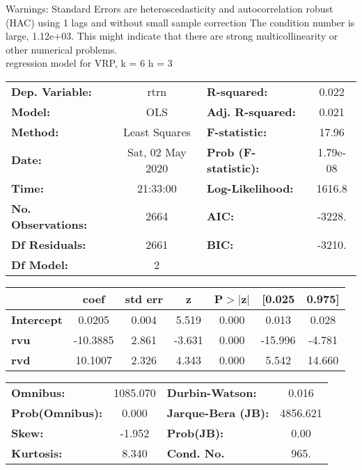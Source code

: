 Warnings: \newline
 [1] Standard Errors are heteroscedasticity and autocorrelation robust (HAC) using 1 lags and without small sample correction \newline
 [2] The condition number is large, 1.12e+03. This might indicate that there are \newline
 strong multicollinearity or other numerical problems.\\ 

regression model for VRP, k = 6 h = 3\begin{center}
\begin{tabular}{lclc}
\toprule
\textbf{Dep. Variable:}    &       rtrn       & \textbf{  R-squared:         } &     0.022   \\
\textbf{Model:}            &       OLS        & \textbf{  Adj. R-squared:    } &     0.021   \\
\textbf{Method:}           &  Least Squares   & \textbf{  F-statistic:       } &     17.96   \\
\textbf{Date:}             & Sat, 02 May 2020 & \textbf{  Prob (F-statistic):} &  1.79e-08   \\
\textbf{Time:}             &     21:33:00     & \textbf{  Log-Likelihood:    } &    1616.8   \\
\textbf{No. Observations:} &        2664      & \textbf{  AIC:               } &    -3228.   \\
\textbf{Df Residuals:}     &        2661      & \textbf{  BIC:               } &    -3210.   \\
\textbf{Df Model:}         &           2      & \textbf{                     } &             \\
\bottomrule
\end{tabular}
\begin{tabular}{lcccccc}
                   & \textbf{coef} & \textbf{std err} & \textbf{z} & \textbf{P$> |$z$|$} & \textbf{[0.025} & \textbf{0.975]}  \\
\midrule
\textbf{Intercept} &       0.0205  &        0.004     &     5.519  &         0.000        &        0.013    &        0.028     \\
\textbf{rvu}       &     -10.3885  &        2.861     &    -3.631  &         0.000        &      -15.996    &       -4.781     \\
\textbf{rvd}       &      10.1007  &        2.326     &     4.343  &         0.000        &        5.542    &       14.660     \\
\bottomrule
\end{tabular}
\begin{tabular}{lclc}
\textbf{Omnibus:}       & 1085.070 & \textbf{  Durbin-Watson:     } &    0.016  \\
\textbf{Prob(Omnibus):} &   0.000  & \textbf{  Jarque-Bera (JB):  } & 4856.621  \\
\textbf{Skew:}          &  -1.952  & \textbf{  Prob(JB):          } &     0.00  \\
\textbf{Kurtosis:}      &   8.340  & \textbf{  Cond. No.          } &     965.  \\
\bottomrule
\end{tabular}
\end{center}

